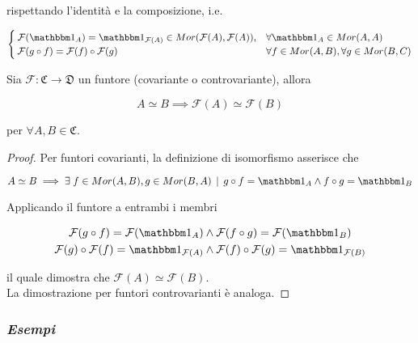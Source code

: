 rispettando l'identità e la composizione, i.e.

\begin{equation}
	\begin{cases}
		\mathcal{F}(\bigone_{A}) = \bigone_{\mathcal{F}(A)} \in Mor(\mathcal{F}(A),\mathcal{F}(A)), & \forall \bigone_{A} \in Mor(A,A)\\
		\mathcal{F}(g \circ f) = \mathcal{F}(f) \circ \mathcal{F}(g) & \forall f \in Mor(A,B), \forall g \in Mor(B,C)
	\end{cases}
\end{equation}

\begin{remark}
	Sia $ \mathcal{F} : \mathfrak{C} \to \mathfrak{D} $ un funtore (covariante o controvariante), allora
	
	\begin{equation}
		A \simeq B \implies \mathcal{F}(A) \simeq \mathcal{F}(B)
	\end{equation}
	
	per $ \forall A,B \in \mathfrak{C} $.
\end{remark}

\begin{proof}
	Per funtori covarianti, la definizione di isomorfismo asserisce che
	
	\begin{equation}
		A \simeq B \implies \E f \in Mor(A,B), g \in Mor(B,A) \, \mid \, g \circ f = \bigone_{A} \wedge f \circ g = \bigone_{B}
	\end{equation}
	
	Applicando il funtore a entrambi i membri
	
	\begin{align}
		\begin{split}
			\mathcal{F}(g \circ f) = \mathcal{F}(\bigone_{A}) &\wedge \mathcal{F}(f \circ g) = \mathcal{F}(\bigone_{B})\\
			\mathcal{F}(g) \circ \mathcal{F}(f) = \bigone_{\mathcal{F}(A)} &\wedge \mathcal{F}(f) \circ \mathcal{F}(g) = \bigone_{\mathcal{F}(B)}
		\end{split}
	\end{align}
	
	il quale dimostra che $ \mathcal{F}(A) \simeq \mathcal{F}(B) $.\\
	La dimostrazione per funtori controvarianti è analoga.
\end{proof}

\subsubsection{\textit{Esempi}}

